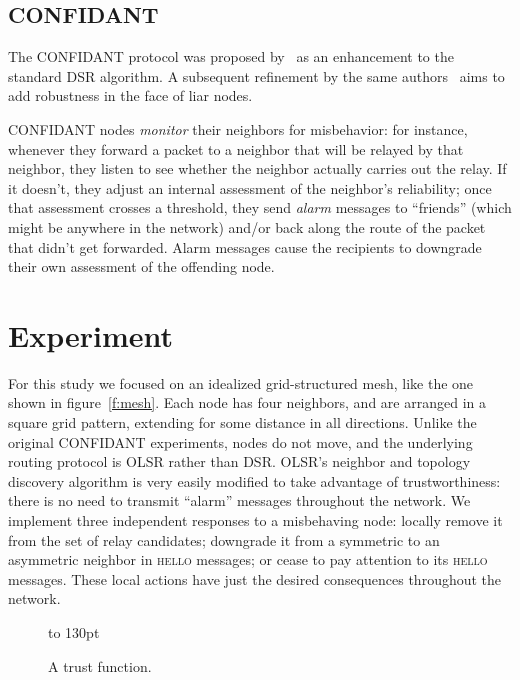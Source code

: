 \documentclass{article}
\begin{document}
\subsection{CONFIDANT}

The CONFIDANT protocol was proposed by~\textcite{buchegger2002b} as an
enhancement to the standard DSR algorithm.  A subsequent refinement by
the same authors~\cite{buchegger2003} aims to add robustness in the
face of liar nodes.

CONFIDANT nodes \emph{monitor} their neighbors for misbehavior: for
instance, whenever they forward a packet to a neighbor that will be
relayed by that neighbor, they listen to see whether the neighbor
actually carries out the relay.  If it doesn't, they adjust an
internal assessment of the neighbor's reliability; once that
assessment crosses a threshold, they send \emph{alarm} messages to
“friends” (which might be anywhere in the network) and/or back along
the route of the packet that didn't get forwarded.  Alarm messages
cause the recipients to downgrade their own assessment of the
offending node.

\section{Experiment}

For this study we focused on an idealized grid-structured mesh, like
the one shown in figure~\ref{f:mesh}.  Each node has four neighbors,
and are arranged in a square grid pattern, extending for some distance
in all directions.  Unlike the original CONFIDANT experiments, nodes
do not move, and the underlying routing protocol is OLSR rather than
DSR.  OLSR's neighbor and topology discovery algorithm is very easily
modified to take advantage of trustworthiness: there is no need to
transmit “alarm” messages throughout the network.  We implement three
independent responses to a misbehaving node: locally remove it from
the set of relay candidates; downgrade it from a symmetric to an
asymmetric neighbor in \textsc{hello} messages; or cease to pay
attention to its \textsc{hello} messages.  These local actions have
just the desired consequences throughout the network.

\begin{figure}
\hbox to 130pt{\hss}%
\caption{A trust function.}\label{f:gene}
\end{figure}
\end{document}
